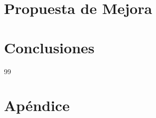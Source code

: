 \documentclass[12pt]{article}
\begin{document}

\section{Propuesta de Mejora}
\label{sec:mejora}


\section{Conclusiones}
\label{sec:conclusiones}


\newpage


\begin{thebibliography}{99}


\end{thebibliography}

\appendix
\section{Apéndice}
\label{app:apendice}

\end{document}
